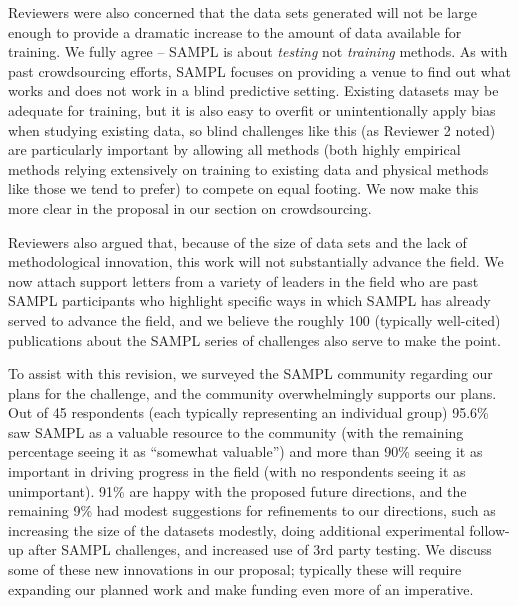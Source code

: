 \documentclass[11pt]{article}
\begin{document}
Reviewers were also concerned that the data sets generated will not be large enough to provide a dramatic increase to the amount of data available for training. 
We fully agree -- SAMPL is about \emph{testing} not \emph{training} methods.
As with past crowdsourcing efforts, SAMPL focuses on providing a venue to find out what works and does not work in a blind predictive setting.
Existing datasets may be adequate for training, but it is also easy to overfit or unintentionally apply bias when studying existing data, so blind challenges like this (as Reviewer 2 noted) are particularly important by allowing all methods (both highly empirical methods relying extensively on training to existing data and physical methods like those we tend to prefer) to compete on equal footing.
We now make this more clear in the proposal in our section %
on crowdsourcing.

Reviewers also argued that, because of the size of data sets and the lack of methodological innovation, this work will not substantially advance the field. 
We now attach support letters from a variety of leaders in the field who are past SAMPL participants who highlight specific ways in which SAMPL has already served to advance the field, and we believe the roughly 100 (typically well-cited) publications about the SAMPL series of challenges also serve to make the point.

To assist with this revision, we surveyed the SAMPL community regarding our plans for the challenge, and the community overwhelmingly supports our plans. 
Out of 45 respondents (each typically representing an individual group) 95.6\% saw SAMPL as a valuable resource to the community (with the remaining percentage seeing it as ``somewhat valuable'') and more than 90\% seeing it as important in driving progress in the field (with no respondents seeing it as unimportant). 91\% are happy with the proposed future directions, and the remaining 9\% had modest suggestions for refinements to our directions, such as increasing the size of the datasets modestly, doing additional experimental follow-up after SAMPL challenges, and increased use of 3rd party testing. 
We discuss some of these new innovations in our proposal; typically these will require expanding our planned work and make funding even more of an imperative.
\end{document}
